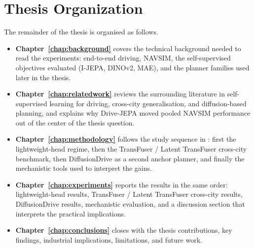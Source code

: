 \section{Thesis Organization}
\label{sec:organization}

The remainder of the thesis is organised as follows.

\begin{itemize}
    \item \textbf{Chapter~\ref{chap:background}} covers the technical background needed to read the experiments: end-to-end driving, NAVSIM, the self-supervised objectives evaluated (I-JEPA, DINOv2, MAE), and the planner families used later in the thesis.
    \item \textbf{Chapter~\ref{chap:relatedwork}} reviews the surrounding literature in self-supervised learning for driving, cross-city generalisation, and diffusion-based planning, and explains why Drive-JEPA moved pooled NAVSIM performance out of the center of the thesis question.
    \item \textbf{Chapter~\ref{chap:methodology}} follows the study sequence in : first the lightweight-head regime, then the TransFuser / Latent TransFuser cross-city benchmark, then DiffusionDrive as a second anchor planner, and finally the mechanistic tools used to interpret the gains.
    \item \textbf{Chapter~\ref{chap:experiments}} reports the results in the same order: lightweight-head results, TransFuser / Latent TransFuser cross-city results, DiffusionDrive results, mechanistic evaluation, and a discussion section that interprets the practical implications.
    \item \textbf{Chapter~\ref{chap:conclusions}} closes with the thesis contributions, key findings, industrial implications, limitations, and future work.
\end{itemize}

